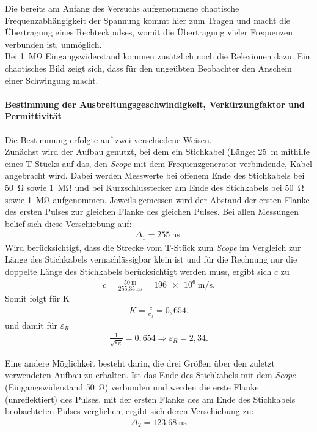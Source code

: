 \documentclass[a4paper,twoside,final]{article}
\begin{document}
Die bereits am Anfang des Versuchs aufgenommene chaotische Frequenzabhängigkeit der Spannung kommt hier zum Tragen und macht die Übertragung eines Rechteckpulses, womit die Übertragung vieler Frequenzen verbunden ist, unmöglich. \\
Bei \SI{1}{\mega\ohm} Eingangswiderstand kommen zusätzlich noch die Relexionen dazu. Ein chaotisches Bild zeigt sich, dass für den ungeübten Beobachter den Anschein einer Schwingung macht.
\newpage
\paragraph{Bestimmung der Ausbreitungsgeschwindigkeit, Verkürzungfaktor und Permittivität}
Die Bestimmung erfolgte auf zwei verschiedene Weisen. \\
Zunächst wird der Aufbau genutzt, bei dem ein Stichkabel (Länge: \SI{25}{\metre} mithilfe eines T-Stücks auf das, den \textit{Scope} mit dem Frequenzgenerator verbindende, Kabel angebracht wird. Dabei werden Messwerte bei offenem Ende des Stichkabels bei \SI{50}{\ohm} sowie \SI{1}{\mega\ohm} und bei Kurzschlusstecker am Ende des Stichkabels bei \SI{50}{\ohm} sowie \SI{1}{\mega\ohm} aufgenommen. Jeweils gemessen wird der Abstand der ersten Flanke des ersten Pulses zur gleichen Flanke des gleichen Pulses. Bei allen Messungen belief sich diese Verschiebung auf:
\begin{align}
\Delta_1 = \SI{255}{\nano\second}.
\end{align}
Wird berücksichtigt, dass die Strecke vom T-Stück zum \textit{Scope} im Vergleich zur Länge des Stichkabels vernachlässigbar klein ist und für die Rechnung nur die doppelte Länge des Stichkabels berücksichtigt werden muss, ergibt sich $c$ zu
\begin{align}
c = \frac{\SI{50}{\metre}}{\SI{255,35}{\nano\second}} = \SI{196e6}{\metre\per\second}.
\end{align}
Somit folgt für K
\begin{align}
K = \frac{c}{c_0} = 0,654.
\end{align}
und damit für $\varepsilon_R$
\begin{align}
\frac{1}{\sqrt{\varepsilon_R}} = 0,654 \Rightarrow \varepsilon_R = 2,34.
\end{align}

Eine andere Möglichkeit besteht darin, die drei Größen über den zuletzt verwendeten Aufbau zu erhalten. Ist das Ende des Stichkabels mit dem \textit{Scope} (Eingangswiderstand \SI{50}{\ohm}) verbunden und werden die erste Flanke (unreflektiert) des Pulses, mit der ersten Flanke des am Ende des Stichkabels beobachteten Pulses verglichen, ergibt sich deren Verschiebung zu:
\begin{align}
\Delta_2  = \SI{123,68}{\nano\second}
\end{align}
\end{document}
